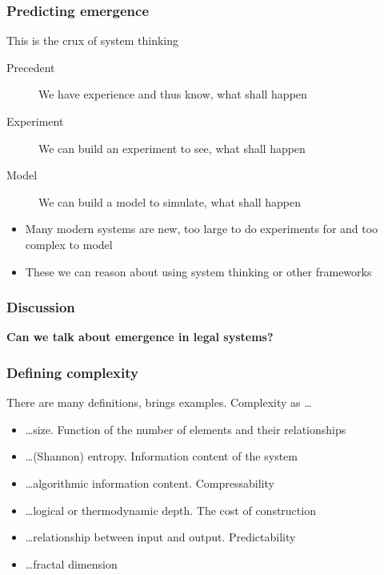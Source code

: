 \documentclass[10pt, compress]{beamer}
\begin{document}
\begin{frame}
	\frametitle{Predicting emergence}
	This is the crux of system thinking \\
	\begin{description}
		\item[Precedent] We have experience and thus know, what shall happen
		\item[Experiment] We can build an experiment to see, what shall happen
		\item[Model] We can build a model to simulate, what shall happen
	\end{description}
	
	\begin{itemize}
		\item Many modern systems are new, too large to do experiments for and too complex to model
		\item These we can reason about using system thinking or other frameworks
	\end{itemize}
\end{frame}

\begin{frame}[fragile]
  \frametitle{Discussion}
		\begin{center}
			\textbf{Can we talk about emergence in legal systems?}
		\end{center}
\end{frame}

\begin{frame}
	\frametitle{Defining complexity}
		There are many definitions, \cite{mitchell2009complexity} brings examples. Complexity as \ldots
	
		\begin{itemize}
			\item \ldots size. Function of the number of elements and their relationships
			\item \ldots (Shannon) entropy. Information content of the system
			\item \ldots algorithmic information content. Compressability
			\item \ldots logical or thermodynamic depth. The cost of construction
			\item \ldots relationship between input and output. Predictability 
			\item \ldots fractal dimension
	\end{itemize}

\end{frame}
\end{document}
